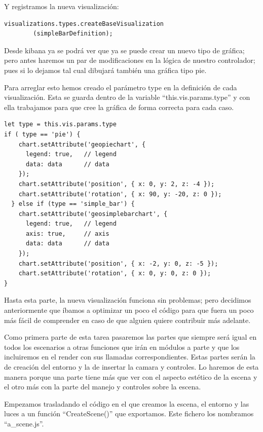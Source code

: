 \documentclass[a4paper, 12pt]{book}
\begin{document}
Y registramos la nueva visualización:

\begin{lstlisting}[frame=single]
visualizations.types.createBaseVisualization
        (simpleBarDefinition);
\end{lstlisting}

Desde kibana ya se podrá ver que ya se puede crear un nuevo tipo de gráfica; pero antes haremos un par de modificaciones en la lógica de nuestro controlador; pues si lo dejamos tal cual dibujará también una gráfica tipo pie.

Para arreglar esto hemos creado el parámetro type en la definición de cada visualización. Esta se guarda dentro de la variable “this.vis.params.type” y con ella trabajamos para que cree la gráfica de forma correcta para cada caso.

\begin{lstlisting}[frame=single]
let type = this.vis.params.type
if ( type == 'pie') {
    chart.setAttribute('geopiechart', {
      legend: true,   // legend
      data: data      // data
    });
    chart.setAttribute('position', { x: 0, y: 2, z: -4 });
    chart.setAttribute('rotation', { x: 90, y: -20, z: 0 });
  } else if (type == 'simple_bar') {
    chart.setAttribute('geosimplebarchart', {
      legend: true,   // legend
      axis: true,     // axis
      data: data      // data
    });
    chart.setAttribute('position', { x: -2, y: 0, z: -5 });
    chart.setAttribute('rotation', { x: 0, y: 0, z: 0 });
}
\end{lstlisting}

Hasta esta parte, la nueva visualización funciona sin problemas; pero decidimos anteriormente que íbamos a optimizar un poco el código para que fuera un poco más fácil de comprender en caso de que alguien quiere contribuir más adelante.

Como primera parte de esta tarea pasaremos las partes que siempre será igual en todos los escenarios a otras funciones que irán en módulos a parte y que los incluiremos en el render con sus llamadas correspondientes. Estas partes serán la de creación del entorno y la de insertar la camara y controles. Lo haremos de esta manera porque una parte tiene más que ver con el aspecto estético de la escena y el otro más con la parte del manejo y controles sobre la escena.

Empezamos trasladando el código en el que creamos la escena, el entorno y las luces a un función “CreateScene()” que exportamos. Este fichero los nombramos “a\_scene.js”.
\end{document}
